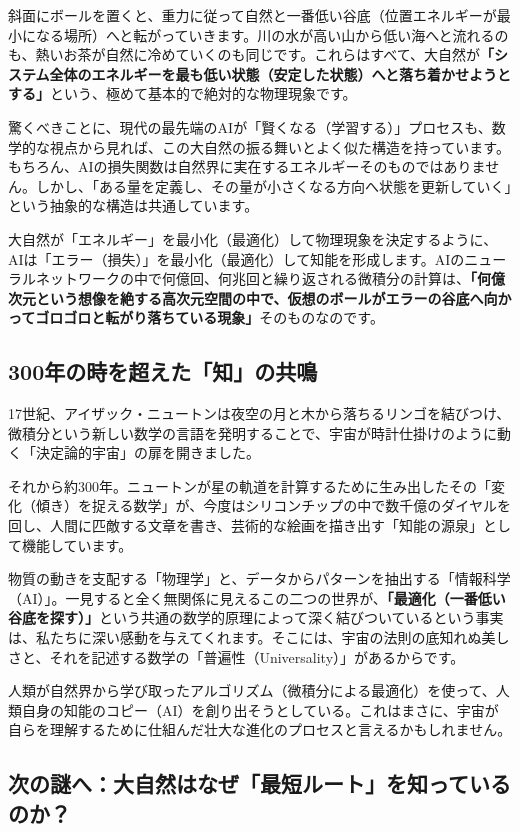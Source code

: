 斜面にボールを置くと、重力に従って自然と一番低い谷底（位置エネルギーが最小になる場所）へと転がっていきます。川の水が高い山から低い海へと流れるのも、熱いお茶が自然に冷めていくのも同じです。これらはすべて、大自然が\textbf{「システム全体のエネルギーを最も低い状態（安定した状態）へと落ち着かせようとする」}という、極めて基本的で絶対的な物理現象です。

驚くべきことに、現代の最先端のAIが「賢くなる（学習する）」プロセスも、数学的な視点から見れば、この大自然の振る舞いとよく似た構造を持っています。もちろん、AIの損失関数は自然界に実在するエネルギーそのものではありません。しかし、「ある量を定義し、その量が小さくなる方向へ状態を更新していく」という抽象的な構造は共通しています。

大自然が「エネルギー」を最小化（最適化）して物理現象を決定するように、AIは「エラー（損失）」を最小化（最適化）して知能を形成します。AIのニューラルネットワークの中で何億回、何兆回と繰り返される微積分の計算は、\textbf{「何億次元という想像を絶する高次元空間の中で、仮想のボールがエラーの谷底へ向かってゴロゴロと転がり落ちている現象」}そのものなのです。

\subsection{300年の時を超えた「知」の共鳴}

17世紀、アイザック・ニュートンは夜空の月と木から落ちるリンゴを結びつけ、微積分という新しい数学の言語を発明することで、宇宙が時計仕掛けのように動く「決定論的宇宙」の扉を開きました。

それから約300年。ニュートンが星の軌道を計算するために生み出したその「変化（傾き）を捉える数学」が、今度はシリコンチップの中で数千億のダイヤルを回し、人間に匹敵する文章を書き、芸術的な絵画を描き出す「知能の源泉」として機能しています。

物質の動きを支配する「物理学」と、データからパターンを抽出する「情報科学（AI）」。一見すると全く無関係に見えるこの二つの世界が、\textbf{「最適化（一番低い谷底を探す）」}という共通の数学的原理によって深く結びついているという事実は、私たちに深い感動を与えてくれます。そこには、宇宙の法則の底知れぬ美しさと、それを記述する数学の「普遍性（Universality）」があるからです。

人類が自然界から学び取ったアルゴリズム（微積分による最適化）を使って、人類自身の知能のコピー（AI）を創り出そうとしている。これはまさに、宇宙が自らを理解するために仕組んだ壮大な進化のプロセスと言えるかもしれません。

\subsection{次の謎へ：大自然はなぜ「最短ルート」を知っているのか？}

